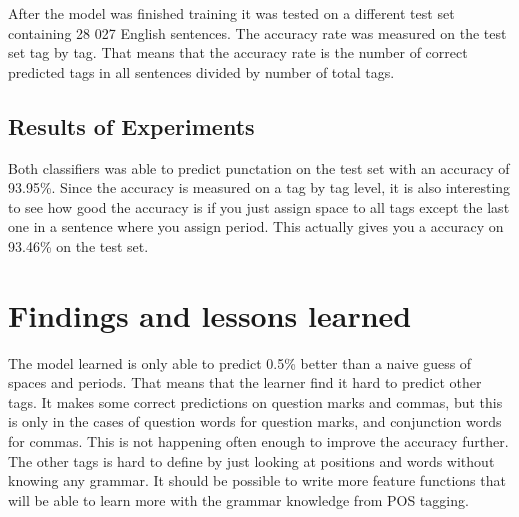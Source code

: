 \documentclass[12pt]{article}
\begin{document}
After the model was finished training it was tested on a different test set containing 28 027 English sentences. The accuracy rate was measured on the test set tag by tag. That means that the accuracy rate is the number of correct predicted tags in all sentences divided by number of total tags.

\subsection*{Results of Experiments}
Both classifiers was able to predict punctation on the test set with an accuracy of 93.95\%. Since the accuracy is measured on a tag by tag level, it is also interesting to see how good the accuracy is if you just assign space to all tags except the last one in a sentence where you assign period. This actually gives you a accuracy on 93.46\% on the test set. 


\section*{Findings and lessons learned}
The model learned is only able to predict 0.5\% better than a naive guess of spaces and periods. That means that the learner find it hard to predict other tags. It makes some correct predictions on question marks and commas, but this is only in the cases of question words for question marks, and conjunction words for commas. This is not happening often enough to improve the accuracy further. The other tags is hard to define by just looking at positions and words without knowing any grammar. It should be possible to write more feature functions that will be able to learn more with the grammar knowledge from POS tagging.















\clearpage
\end{document}
